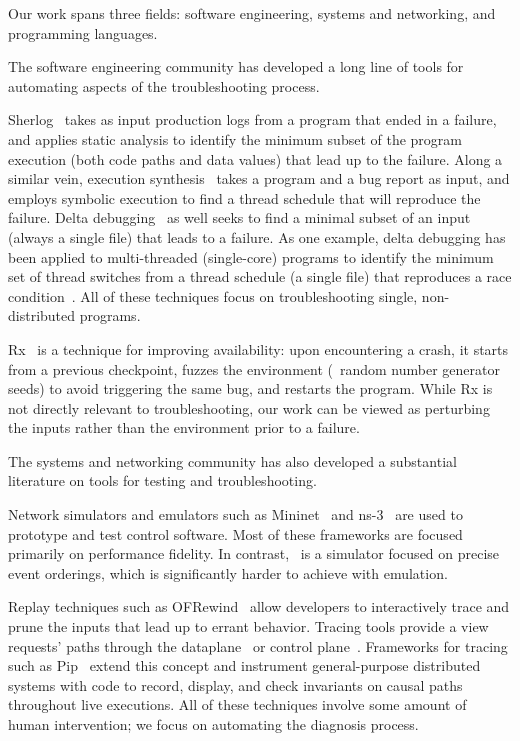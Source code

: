 Our work spans three fields: software engineering, systems and networking, and
programming languages.

The software engineering community has developed a long line of tools for automating
aspects of the troubleshooting process.

Sherlog~\cite{Yuan:2010:SED:1736020.1736038} takes as input production logs from a
program that ended in a failure, and applies static analysis to identify the minimum subset of the
program execution (both code paths and data values) that lead up to the failure.
Along a similar vein, execution
synthesis~\cite{Zamfir:2010:EST:1755913.1755946} takes a program and a bug
report as input, and employs symbolic execution to find a thread schedule that will
reproduce the failure. Delta
debugging~\cite{Zeller:2002:SIF:506201.506206} as well seeks to find a minimal
subset of an input (always a single file) that leads to a failure. As one
example, delta debugging has been applied to multi-threaded (single-core) programs
to identify the minimum set of thread
switches from a thread schedule (a single file) that reproduces
a race condition~\cite{choi2002isolating}.
All of these techniques focus on troubleshooting single, non-distributed programs.

Rx~\cite{qin2005rx} is a technique for improving availability: upon
encountering a crash, it starts from a previous checkpoint, fuzzes
the environment (\eg~random number generator seeds) to avoid triggering the same bug,
and restarts the program. While Rx is not directly relevant to troubleshooting,
our work can be viewed as perturbing the inputs rather than the environment
prior to a failure.

The systems and networking community has also developed a substantial
literature on tools for testing and troubleshooting.

Network simulators and emulators such as
Mininet~\cite{Lantz:2010:NLR:1868447.1868466} and ns-3~\cite{ns3}
are used to prototype and test control software. Most of these frameworks are focused
primarily on performance fidelity. In contrast, \projectname~is a simulator focused on
precise event orderings, which is significantly harder to achieve with
emulation.

Replay techniques such as OFRewind~\cite{ofrewind} allow developers to interactively
trace and prune the inputs that lead up to errant behavior. Tracing tools provide a view
requests' paths through the dataplane~\cite{handigol2012debugger} or control
plane~\cite{fonseca2007x}. Frameworks for tracing such as Pip~\cite{pip} extend this
concept and instrument general-purpose distributed systems
with code to record, display, and check invariants on causal paths throughout
live executions. All of these techniques involve some amount of human
intervention; we focus on automating the diagnosis process.

